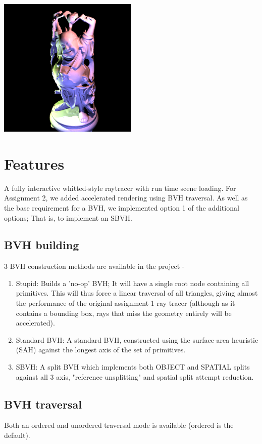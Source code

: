 
\includegraphics[width=0.5\textwidth]{img/buddha.png}

\section{Features}
A fully interactive whitted-style raytracer with run time scene loading. 
For Assignment 2, we added accelerated rendering using BVH traversal. As well as the base requirement for a BVH, we implemented option 1 of the additional options; That is, to implement an SBVH.

\subsection{BVH building}
3 BVH construction methods are available in the project -
    \begin{enumerate}
        \item Stupid: Builds a 'no-op' BVH; It will have a single root node containing all primitives. This will thus force a linear traversal of all triangles, giving almost the performance of the original assignment 1 ray tracer (although as it contains a bounding box, rays that miss the geometry entirely will be accelerated).
        \item Standard BVH: A standard BVH, constructed using the surface-area heuristic (SAH) against the longest axis of the set of primitives.
        \item SBVH: A split BVH which implements both OBJECT and SPATIAL splits against all 3 axis, "reference unsplitting" and spatial split attempt reduction.
    \end{enumerate}

\subsection{BVH traversal}
Both an ordered and unordered traversal mode is available (ordered is the default).
